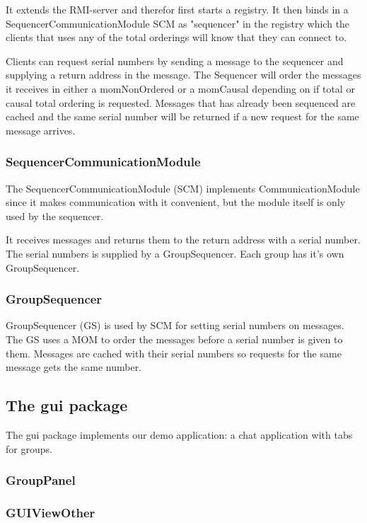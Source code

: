 \documentclass[english]{article}
\begin{document}
It extends the RMI-server and therefor first starts a registry. It then binds in a SequencerCommunicationModule SCM as "sequencer" in the registry which the clients that uses any of the total orderings will know that they can connect to. 

Clients can request serial numbers by sending a message to the sequencer and supplying a return address in the message. The Sequencer will order the messages it receives in either a momNonOrdered or a momCausal depending on if total or causal total ordering is requested. Messages that has already been sequenced are cached and the same serial number will be returned if a new request for the same message arrives.

\subsubsection{SequencerCommunicationModule}
The SequencerCommunicationModule (SCM) implements CommunicationModule since it makes communication with it convenient, but the module itself is only used by the sequencer. 

It receives messages and returns them to the return address with a serial number. The serial numbers is supplied by a GroupSequencer. Each group has it's own GroupSequencer.

\subsubsection{GroupSequencer}
GroupSequencer (GS) is used by SCM for setting serial numbers on messages. The GS uses a MOM to order the messages before a serial number is given to them. Messages are cached with their serial numbers so requests for the same message gets the same number. 


\subsection{The gui package}                                                                                    
The gui package implements our demo application: a chat application with tabs for groups. 

\subsubsection{GroupPanel}

\subsubsection{GUIViewOther}
\end{document}

